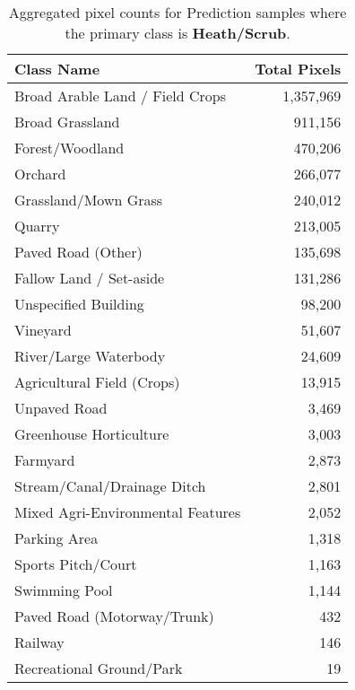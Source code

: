 \begin{table}[H] %
    \centering
    \caption{Aggregated pixel counts for Prediction samples where the primary class is \textbf{Heath/Scrub}.}
    \label{tab:pred_counts_12}
    \begin{tabular}{lr}
        \hline
        \textbf{Class Name} & \textbf{Total Pixels} \\
        \hline
        Broad Arable Land / Field Crops & 1,357,969 \\
        Broad Grassland & 911,156 \\
        Forest/Woodland & 470,206 \\
        Orchard & 266,077 \\
        Grassland/Mown Grass & 240,012 \\
        Quarry & 213,005 \\
        Paved Road (Other) & 135,698 \\
        Fallow Land / Set-aside & 131,286 \\
        Unspecified Building & 98,200 \\
        Vineyard & 51,607 \\
        River/Large Waterbody & 24,609 \\
        Agricultural Field (Crops) & 13,915 \\
        Unpaved Road & 3,469 \\
        Greenhouse Horticulture & 3,003 \\
        Farmyard & 2,873 \\
        Stream/Canal/Drainage Ditch & 2,801 \\
        Mixed Agri-Environmental Features & 2,052 \\
        Parking Area & 1,318 \\
        Sports Pitch/Court & 1,163 \\
        Swimming Pool & 1,144 \\
        Paved Road (Motorway/Trunk) & 432 \\
        Railway & 146 \\
        Recreational Ground/Park & 19 \\
        \hline
    \end{tabular}
\end{table}

